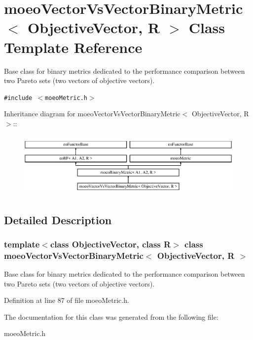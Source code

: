 \section{moeo\-Vector\-Vs\-Vector\-Binary\-Metric$<$ Objective\-Vector, R $>$ Class Template Reference}
\label{classmoeoVectorVsVectorBinaryMetric}
Base class for binary metrics dedicated to the performance comparison between two Pareto sets (two vectors of objective vectors).  


{\tt \#include $<$moeo\-Metric.h$>$}

Inheritance diagram for moeo\-Vector\-Vs\-Vector\-Binary\-Metric$<$ Objective\-Vector, R $>$::\begin{figure}[H]
\begin{center}
\leavevmode
\includegraphics[height=3.22767cm]{classmoeoVectorVsVectorBinaryMetric}
\end{center}
\end{figure}


\subsection{Detailed Description}
\subsubsection*{template$<$class Objective\-Vector, class R$>$ class moeo\-Vector\-Vs\-Vector\-Binary\-Metric$<$ Objective\-Vector, R $>$}

Base class for binary metrics dedicated to the performance comparison between two Pareto sets (two vectors of objective vectors). 



Definition at line 87 of file moeo\-Metric.h.

The documentation for this class was generated from the following file:\begin{CompactItemize}
\item 
moeo\-Metric.h\end{CompactItemize}
